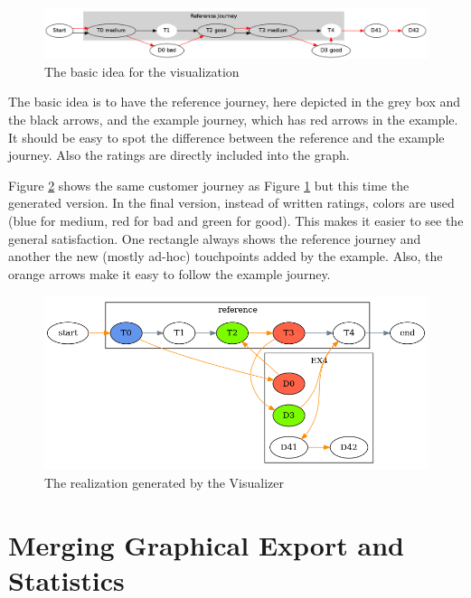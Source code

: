 \documentclass[12pt]{scrartcl}
\begin{document}
\begin{figure}[hbtp]
	\centering
	\includegraphics[scale=0.33]{img/sample_journey1.png}
	\caption{The basic idea for the visualization}
	\label{figure:sample_figure}
\end{figure}

The basic idea is to have the reference journey, here depicted in the grey box and the black arrows, and the 
example journey, which has red arrows in the example. It should be easy to spot the difference between the
reference and the example journey. Also the ratings are directly included into the graph.

Figure \ref{figure:sample_figure2} shows the same customer journey as Figure \ref{figure:sample_figure} but this
time the generated version. In the final version, instead of written ratings, colors are used (blue for
medium, red for bad and green for good). This makes it easier to see the general satisfaction. One rectangle always
shows the reference journey and another the new (mostly ad-hoc) touchpoints added by the example. Also, the orange
arrows make it easy to follow the example journey.

\begin{figure}[hbtp]
	\centering
	\includegraphics[scale=0.5]{img/sample_journey2.png}
	\caption{The realization generated by the Visualizer}
	\label{figure:sample_figure2}
\end{figure}

\section{Merging Graphical Export and Statistics}
\label{section:merge}
\end{document}
